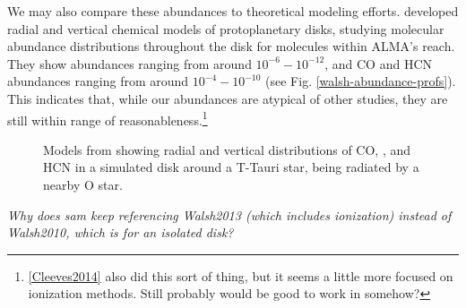 We may also compare these abundances to theoretical modeling efforts. \citet{Walsh2010} developed radial and vertical chemical models of protoplanetary disks, studying molecular abundance distributions throughout the disk for molecules within ALMA's reach. They show \hco abundances ranging from around $10^{-6} - 10^{-12}$, and CO and HCN abundances ranging from around $10^{-4} - 10^{-10}$ (see Fig. \ref{walsh-abundance-profs}). This indicates that, while our \hco abundances are atypical of other studies, they are still within range of reasonableness.\footnote{\ref{Cleeves2014} also did this sort of thing, but it seems a little more focused on ionization methods. Still probably would be good to work in somehow?}





\begin{figure}[htp]
  \hspace*{\fill}%
  \hfill%
  \hspace*{\fill}%
  \caption{Models from \citet{Walsh2013} showing radial and vertical distributions of CO, \hco, and HCN in a simulated disk around a T-Tauri star, being radiated by a nearby O star.}
  \label{fig:walsh-abundance-profs}
\end{figure}


\textit{Why does sam keep referencing Walsh2013 (which includes ionization) instead of Walsh2010, which is for an isolated disk?}








